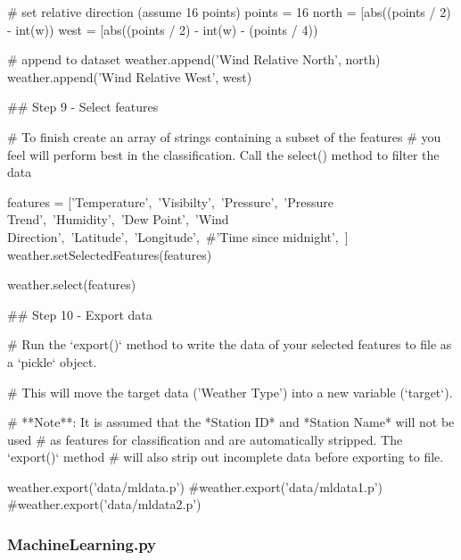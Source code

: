 \documentclass[12pt]{article}
\begin{document}
\begin{python}
# set relative direction (assume 16 points)
points = 16
north = [abs((points / 2) - int(w))%
west = [abs((points / 2) - int(w) - (points / 4))%

# append to dataset
weather.append('Wind Relative North', north)
weather.append('Wind Relative West', west)

## Step 9 - Select features

# To finish create an array of strings containing a subset of the features
# you feel will perform best in the classification. Call the select() method to filter the data

features = ['Temperature',\
 'Visibilty',\
  'Pressure',\
   'Pressure Trend',\
    'Humidity',\
     'Dew Point',\
      'Wind Direction',\
       'Latitude',\
        'Longitude',\
        #'Time since midnight',\
        ]
weather.setSelectedFeatures(features)

weather.select(features)

## Step 10 - Export data

# Run the `export()` method to write the data of your selected features to file as a `pickle` object.

# This will move the target data ('Weather Type') into a new variable (`target`).

# **Note**: It is assumed that the *Station ID*  and *Station Name* will not be used
# as features for classification and are automatically stripped. The `export()` method
# will also strip out incomplete data before exporting to file.

weather.export('data/mldata.p')
#weather.export('data/mldata1.p')
#weather.export('data/mldata2.p')

\end{python}

\subsubsection{MachineLearning.py}
\end{document}
